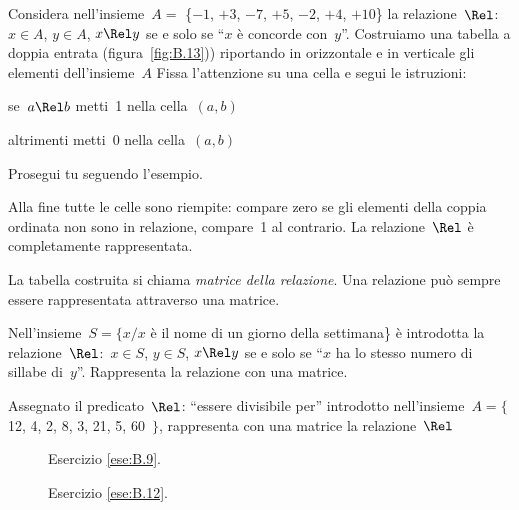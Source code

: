 \begin{multicols}{2}
\begin{esercizio}
\label{ese:B.9}
Considera nell'insieme~$A =$ \{$-1$, $+3$, $-7$, $+5$, $-2$, $+4$, $+10$\} 
la relazione~$\Rel$:~$x \in A$, $y \in A$, $x \Rel y$ se e solo se ``$x$
è concorde con~$y$''. Costruiamo una tabella a doppia entrata 
(figura~\ref{fig:B.13})) riportando in orizzontale e in verticale gli elementi 
dell'insieme~$A$
Fissa l'attenzione su una cella e segui le istruzioni:
\begin{itemize*}
\item se~$a \Rel b$ metti~1 nella cella~$(a,b)$
\item altrimenti metti~0 nella cella~$(a,b)$
\end{itemize*}
Prosegui tu seguendo l'esempio.
\end{esercizio}

\osservazione Alla fine tutte le celle sono riempite: compare zero se gli 
elementi della coppia ordinata non sono in relazione, compare~1 al contrario.
La relazione~$\Rel$ è completamente rappresentata.

La tabella costruita si chiama \emph{matrice della relazione}.
Una relazione può sempre essere rappresentata attraverso una matrice.

\begin{esercizio}
\label{ese:B.10}
Nell'insieme~$S = \{ x / x$ è il nome di un giorno della settimana\} è 
introdotta la relazione~$\Rel$:~$x \in S$, $y \in S$, $x \Rel y$
se e solo se ``$x$ ha lo stesso numero di sillabe di~$y$''. 
Rappresenta la relazione con una matrice.
\end{esercizio}

\begin{esercizio}
\label{ese:B.11}
Assegnato il predicato~$\Rel$: ``essere divisibile per'' introdotto 
nell'insieme~$A =\{$ 12, 4, 2, 8, 3, 21, 5, 60~$\}$, rappresenta con una 
matrice la relazione~$\Rel$
\end{esercizio}

\end{multicols}

\begin{inaccessibleblock}
 \begin{figure}[b]
\begin{minipage}[b]{.45\textwidth}
 \centering
 
 \caption{Esercizio \ref{ese:B.9}.}\label{fig:B.13}
\end{minipage}\hfil
\begin{minipage}[b]{.45\textwidth}
 \centering
 
 \caption{Esercizio \ref{ese:B.12}.}\label{fig:B.14}
\end{minipage}
\end{figure}
\end{inaccessibleblock}

